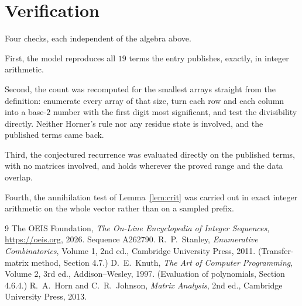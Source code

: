 \documentclass[11pt,a4paper]{article}
\theoremstyle{plain}
\theoremstyle{definition}
\begin{document}
\section{Verification}

Four checks, each independent of the algebra above.

First, the model reproduces all $19$ terms the entry publishes, exactly, in integer
arithmetic.

Second, the count was recomputed for the smallest arrays straight from the definition:
enumerate every array of that size, turn each row and each column into a base-$2$ number with
the first digit most significant, and test the divisibility directly. Neither Horner's rule nor
any residue state is involved, and the published terms came back.

Third, the conjectured recurrence was evaluated directly on the published terms, with no
matrices involved, and holds wherever the proved range and the data overlap.

Fourth, the annihilation test of Lemma~\ref{lem:crit} was carried out in exact integer
arithmetic on the whole vector rather than on a sampled prefix.

\begin{thebibliography}{9}
 The OEIS Foundation, \emph{The On-Line Encyclopedia of Integer
Sequences}, \url{https://oeis.org}, 2026. Sequence A262790.
 R.~P.~Stanley, \emph{Enumerative Combinatorics}, Volume 1, 2nd ed.,
Cambridge University Press, 2011. (Transfer-matrix method, Section 4.7.)
 D.~E.~Knuth, \emph{The Art of Computer Programming}, Volume 2, 3rd ed.,
Addison--Wesley, 1997. (Evaluation of polynomials, Section 4.6.4.)
 R.~A.~Horn and C.~R.~Johnson, \emph{Matrix Analysis}, 2nd ed., Cambridge
University Press, 2013.
\end{thebibliography}
\end{document}
